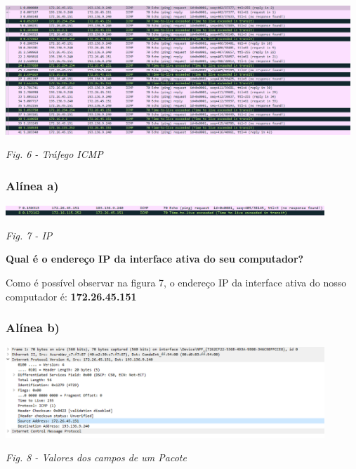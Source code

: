 \documentclass{article}
\begin{document}
\begin{center}
\includegraphics[width=13cm]{unknown.png}\par\caption{\textit{Fig. 6 - Tráfego ICMP}}\par
\end{center}

\subsubsection{Alínea a)}\par\vspace{0.5cm}
\begin{center}
\includegraphics[width=12cm]{ip.png}\par\caption{\textit{Fig. 7 - IP}}\par\vspace{0.3cm}
\end{center}

\textbf{Qual é o endereço IP da interface ativa do seu computador?}\par\vspace{0.35cm}
\hspace{0.5cm}Como é possível observar na figura 7, o endereço IP da interface ativa do nosso computador é: \textbf{172.26.45.151}\par\vspace{0.35cm}

\subsubsection{Alínea b)}\par\vspace{0.5cm}
\begin{center}
\includegraphics[width=12cm]{wda.png}\par\caption{\textit{Fig. 8 - Valores dos campos de um Pacote}}\par\vspace{0.5cm}
\end{center}
\end{document}
